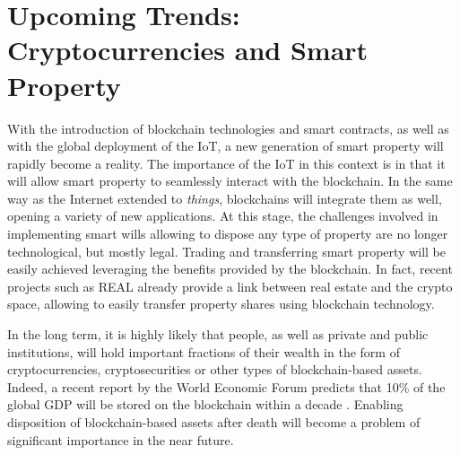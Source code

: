 \section{Upcoming Trends: Cryptocurrencies and Smart Property} %
\label{sec:cryptocurrencies_and_smart_property_the_legacy_vision}

With the introduction of blockchain technologies and smart contracts, as well as with the global deployment of the IoT, a new generation of smart property will rapidly become a reality.
The importance of the IoT in this context is in that it will allow smart property to seamlessly interact with the blockchain. 
In the same way as the Internet extended to \textit{things}, blockchains will integrate them as well, opening a variety of new applications.
At this stage, the challenges involved in implementing smart wills allowing to dispose any type of property are no longer technological, but mostly legal. Trading and transferring smart property will be easily achieved leveraging the benefits provided by the blockchain. %
In fact, recent projects such as REAL \cite{REAL} already provide a link between real estate and the crypto space, allowing to easily transfer property shares using blockchain technology.


In the long term, it is highly likely that people, as well as private and public institutions, will hold important fractions of their wealth in the form of cryptocurrencies, cryptosecurities or other types of blockchain-based assets. Indeed, a recent report by the World Economic Forum predicts that 10\% of the global GDP will be stored on the blockchain within a decade \cite{WEF2017}.  
Enabling disposition of blockchain-based assets after death will become a problem of significant importance in the near future.




